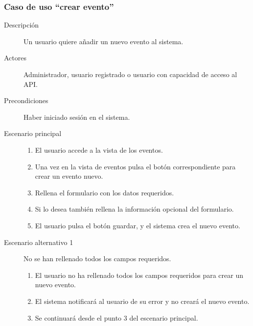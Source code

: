 \subsubsection{Caso de uso ``crear evento''}
\begin{description}
\item[Descripción]  Un usuario quiere añadir un nuevo evento al sistema.
\item[Actores]  Administrador, usuario registrado o usuario con capacidad de acceso al API.
\item[Precondiciones] Haber iniciado sesión en el sistema.
\item[Escenario principal]  \hfill
							\begin{enumerate}
							\item El usuario accede a la vista de los eventos.
							\item Una vez en la vista de eventos pulsa el botón correspondiente para crear un evento nuevo.
							\item Rellena el formulario con los datos requeridos.
							\item Si lo desea también rellena la información opcional del formulario.
							\item El usuario pulsa el botón guardar, y el sistema crea el nuevo evento.
							\end{enumerate}
\item[Escenario alternativo 1] No se han rellenado todos los campos requeridos.
							\begin{enumerate}
							\item El usuario no ha rellenado todos los campos requeridos para crear un nuevo evento.
							\item El sistema notificará al usuario de su error y no creará el nuevo evento.
							\item Se continuará desde el punto 3 del escenario principal.
							\end{enumerate}
\end{description}


